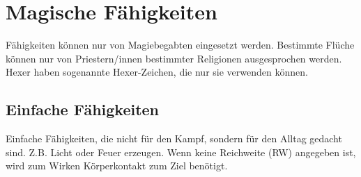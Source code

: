 {\let\clearpage\relax\chapter{Magische Fähigkeiten}}
Fähigkeiten können nur von Magiebegabten eingesetzt werden. Bestimmte Flüche können nur von Priestern/innen bestimmter Religionen ausgesprochen werden. Hexer haben sogenannte Hexer-Zeichen, die nur sie verwenden können.


\section{Einfache Fähigkeiten}
Einfache Fähigkeiten, die nicht für den Kampf, sondern für den Alltag gedacht sind. Z.B. Licht oder Feuer erzeugen. Wenn keine Reichweite (RW) angegeben ist, wird zum Wirken Körperkontakt zum Ziel benötigt.

